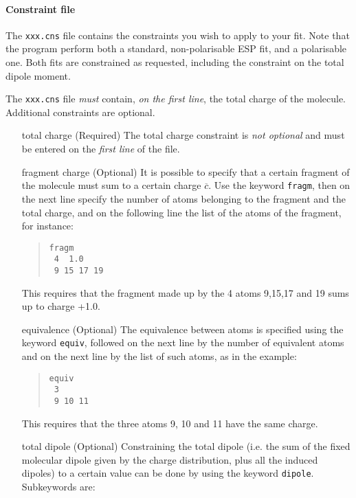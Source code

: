 \documentclass[a4paper]{report}
\begin{document}
\paragraph*{Constraint file}

The \texttt{xxx.cns} file contains the constraints you wish to apply to your
fit. Note that the program perform both a standard, non-polarisable ESP fit, and a
polarisable one. Both fits are constrained as requested, including the constraint on
the total dipole moment.

The \texttt{xxx.cns} file \emph{must} contain, \emph{on the first line}, the total
charge of the molecule. Additional constraints are optional.

\begin{itemize}
\item[total charge] (Required) The total charge constraint is \emph{not optional} and must be
entered on the \emph{first line} of the file.
\item[fragment charge] (Optional) It is possible to specify that a certain fragment of the molecule must sum to a certain charge $\overline{c}$. Use the keyword \texttt{fragm}, then on the next line specify the number of atoms belonging to the fragment and the total charge, and on the following line the list of
the atoms of the fragment, for instance:
\begin{framed}
\begin{quote}
\begin{verbatim}
fragm
 4  1.0
 9 15 17 19
\end{verbatim}
\end{quote}
\end{framed}
This requires that the fragment made up by the 4 atoms 9,15,17 and 19 sums up to
charge +1.0.
\item[equivalence] (Optional) The equivalence between atoms is specified using the keyword \texttt{equiv}, followed on the next line by the number of equivalent atoms and on the next line by the list of such atoms, as in the example:
\begin{framed}
\begin{quote}
\begin{verbatim}
equiv
 3
 9 10 11
\end{verbatim}
\end{quote}
\end{framed}
This requires that the three atoms 9, 10 and 11 have the same charge.
\item[total dipole] (Optional) Constraining the total dipole (i.e. the sum of the fixed molecular dipole given by the charge distribution, plus all the induced dipoles) to a certain value can be done by using the keyword \texttt{dipole}. Subkeywords are: 

\end{itemize}
\end{document}
